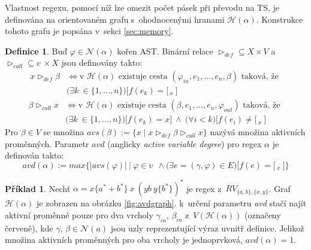 \documentclass[thesis=B,czech]{FITthesis}[2019/12/23]
\theoremstyle{definition}
\newtheorem{definition}{Definice}[chapter]
\newtheorem{example}{Příklad}[chapter]
\begin{document}
Vlastnost regexu, pomocí níž lze omezit počet pásek při převodu na TS, je definována na orientovaném grafu s~ohodnocenými hranami $\mathcal{H}(\alpha)$. Konstrukce tohoto grafu je popsána v~sekci \ref{sec:memory}.

\begin{definition}
Buď $\varphi \in \mathcal{N}(\alpha)$ kořen AST. Binární relace $\triangleright_{def} \subseteq X \times V$ a $\triangleright_{call} \subseteq v~\times X$ jsou definovány takto:
\begin{equation}\begin{split} x \triangleright_{def} \beta &\iff \text{v $\mathcal{H}(\alpha)$ existuje cesta }  (\varphi_{in}, e_1, \dots, e_n, \beta) \text{ taková, že } \\ &\bigg(\exists k~\in \{1, \dots, n\}\bigg) \bigg [ f(e_k)=[\,_x \ \bigg] \end{split}\end{equation}
\begin{equation}\begin{split} \beta \triangleright_{call} x &\iff \text{v $\mathcal{H}(\alpha)$ existuje cesta }  (\beta, e_1, \dots, e_n, \varphi_{out}) \text{ taková, že } \\ &\bigg(\exists k~\in \{1, \dots, n\}\bigg) \bigg [ f(e_k)=x \bigg ] \ \wedge \ \bigg(\forall i < k\bigg) \bigg[ f(e_i)\ne [\,_x \ \bigg] \end{split}\end{equation}
Pro $\beta \in V$ se množina $avs(\beta):=\{x \mid x \triangleright_{def} \beta \triangleright_{call} x\}$ nazývá množina aktivních proměnných. 
Parametr $avd$ (anglicky \emph{active variable degree}) pro regex $\alpha$ je definován takto: \cite{schmidref}
\begin{equation} avd(\alpha) := max\bigg\{|avs(\varphi)| \ \bigg | \ \varphi \in v~\ \wedge \bigg (
\exists e = (\gamma, \varphi) \in E \bigg ) \bigg [ f(e)=[\,_x \ \bigg] \bigg\}\end{equation}
\end{definition}

\begin{example} Nechť $\alpha = x\{a^\ast+b^\ast\} \ x \ (yb \ y \{b^\ast\})^\ast$ je regex z~$RV_{\{a, b\},\{x, y\}}$. Graf $\mathcal{H}(\alpha)$ je zobrazen na obrázku \ref{fig:avdgraph}. k~určení parametru \emph{avd} stačí najít aktivní proměnné pouze pro dva vrcholy $\gamma_{in}$, $\beta_{in}$ z~$V(\mathcal{H}(\alpha))$ (označeny červeně), kde $\gamma$, $\beta \in \mathcal{N}(a)$ jsou uzly reprezentující výraz uvnitř definice. Jelikož množina aktivních proměnných pro oba vrcholy je jednoprvková, $avd(\alpha) = 1$.
\end{example}
\end{document}
